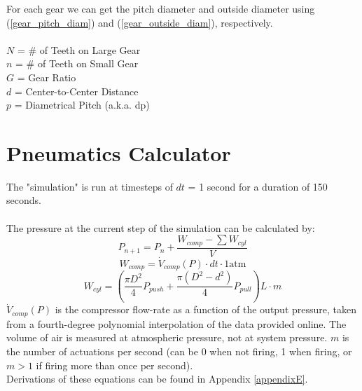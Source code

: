 \documentclass[11pt,a4paper,titlepage]{article}
\begin{document}
	For each gear we can get the pitch diameter and outside diameter using (\ref{gear_pitch_diam}) and (\ref{gear_outside_diam}), respectively. \\ \\
	$N$ = \# of Teeth on Large Gear \\
	$n$ = \# of Teeth on Small Gear \\
	$G$ = Gear Ratio \\
	$d$ = Center-to-Center Distance \\
	$p$ = Diametrical Pitch (a.k.a. dp)\\
	
	\newpage
	\section{Pneumatics Calculator}
	The "simulation" is run at timesteps of $dt$ = 1 second for a duration of 150 seconds. \\ \\
	
	The pressure at the current step of the simulation can be calculated by:
	\begin{equation} \label{pneu_press_timestep}
		P_{n+1} = P_n + \frac{W_{comp} - \sum W_{cyl}}{V}
	\end{equation}
	\begin{equation} \label{pneu_w_comp}
		W_{comp} = \dot{V}_{comp}(P) \cdot dt \cdot 1 \text{atm}
	\end{equation}
	\begin{equation} \label{pneu_w_cyl}
		W_{cyl} = \left( \frac{\pi D^2}{4} P_{push} + \frac{\pi (D^2 - d^2)}{4} P_{pull} \right) L \cdot m
	\end{equation}
	$\dot{V}_{comp}(P)$ is the compressor flow-rate as a function of the output pressure, taken from a fourth-degree polynomial interpolation of the data provided online. The volume of air is measured at atmospheric pressure, not at system pressure. $m$ is the number of actuations per second (can be 0 when not firing, 1 when firing, or $m>1$ if firing more than once per second). \\
	
	Derivations of these equations can be found in Appendix \ref{appendixE}. \\
	
\end{document}
